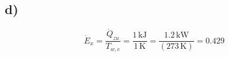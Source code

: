 

\subsection*{d)}

\[
\dot{E}_x = \frac{\dot{Q}_{zu}}{T_{w,e}} = \frac{1 \, \text{kJ}}{1 \, \text{K}} = \frac{1.2 \, \text{kW}}{(273 \, \text{K})} = 0.429
\]